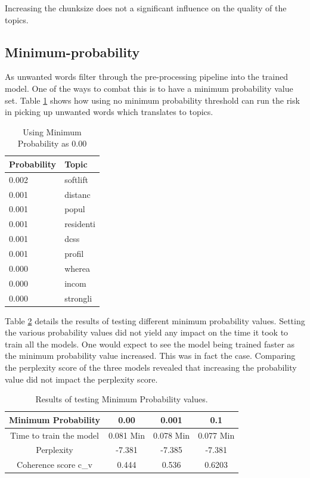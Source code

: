 \begin{lesson}
Increasing the chunksize does not a significant influence on the quality of the topics.
\end{lesson}\label{L:chunksize}

\subsection{Minimum-probability}
As unwanted words filter through the pre-processing pipeline into the trained model. One of the ways to combat this is to have a minimum probability value set. Table \ref{tab:minimum} shows how using no minimum probability threshold can run the risk in picking up unwanted words which translates to topics.
\begin{table}[]
\centering
\begin{tabular}{|l|l|}
\hline
\textbf{Probability} & \textbf{Topic} \\ \hline
0.002 & softlift \\ \hline
0.001 & distanc \\ \hline
0.001 & popul \\ \hline
0.001 & residenti \\ \hline
0.001 & dcss \\ \hline
0.001 & profil \\ \hline
0.000 & wherea \\ \hline
0.000 & incom \\ \hline
0.000 & strongli \\ \hline
\end{tabular}
\caption{Using Minimum Probability as 0.00}
\label{tab:minimum}
\end{table}

Table \ref{tab:prob} details the results of testing different minimum probability values. Setting the various probability values did not yield any impact on the time it took to train all the models. One would expect to see the model being trained faster as the minimum probability value increased. This was in fact the case. Comparing the perplexity score of the three models revealed that increasing the probability value did not impact the perplexity score.

\begin{table}[]
\centering
\begin{tabular}{|c|c|c|c|}
\hline
\multicolumn{1}{|l|}{Minimum Probability} & 0.00 & 0.001 & 0.1 \\ \hline
Time to train the model & 0.081 Min & 0.078 Min & 0.077 Min \\ \hline
Perplexity & -7.381 & -7.385 & -7.381 \\ \hline
Coherence score c\_v & 0.444 & 0.536 & 0.6203 \\ \hline
\end{tabular}
\caption{Results of testing Minimum Probability values.}
\label{tab:prob}
\end{table}

